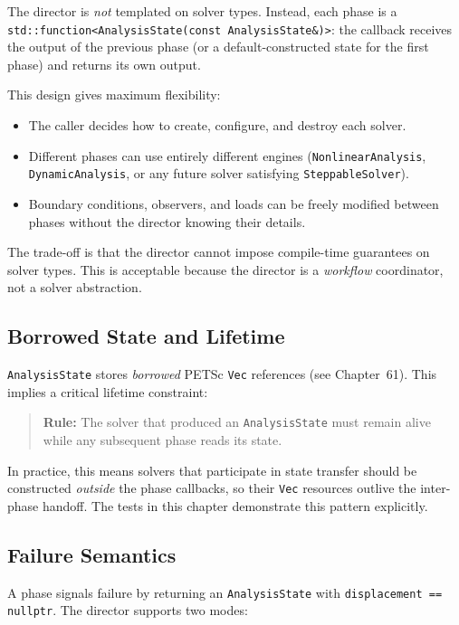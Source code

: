 The director is \emph{not} templated on solver types.  Instead, each
phase is a \texttt{std::function<AnalysisState(const AnalysisState\&)>}:
the callback receives the output of the previous phase (or a
default-constructed state for the first phase) and returns its own
output.

This design gives maximum flexibility:
\begin{itemize}
  \item The caller decides how to create, configure, and destroy each
        solver.
  \item Different phases can use entirely different engines
        (\texttt{NonlinearAnalysis}, \texttt{DynamicAnalysis}, or any
        future solver satisfying \texttt{SteppableSolver}).
  \item Boundary conditions, observers, and loads can be freely modified
        between phases without the director knowing their details.
\end{itemize}

The trade-off is that the director cannot impose compile-time guarantees
on solver types.  This is acceptable because the director is a
\emph{workflow} coordinator, not a solver abstraction.

\subsection{Borrowed State and Lifetime}

\texttt{AnalysisState} stores \emph{borrowed} PETSc \texttt{Vec}
references (see Chapter~61).  This implies a critical lifetime
constraint:

\begin{quote}
\textbf{Rule:} The solver that produced an \texttt{AnalysisState} must
remain alive while any subsequent phase reads its state.
\end{quote}

In practice, this means solvers that participate in state transfer
should be constructed \emph{outside} the phase callbacks, so their
\texttt{Vec} resources outlive the inter-phase handoff.  The tests
in this chapter demonstrate this pattern explicitly.

\subsection{Failure Semantics}

A phase signals failure by returning an \texttt{AnalysisState} with
\texttt{displacement == nullptr}.  The director supports two modes:


